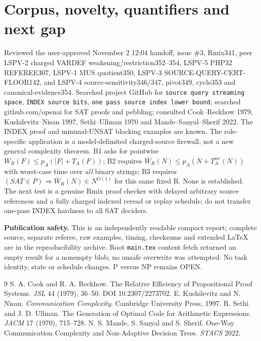 \documentclass[11pt]{article}
\begin{document}
\section*{Corpus, novelty, quantifiers and next gap}
Reviewed the user-approved November 2 12:04 handoff, issue \#3, Rmix341, peer LSPV-2 charged VARDEF weakening/restriction352--354, LSPV-5 PHP32 REFEREE307, LSPV-1 MUS quotient350, LSPV-3 SOURCE-QUERY-CERT-FLOOR142, and LSPV-4 source-sensitivity346/347, pivot349, cycle353 and canonical-evidence354. Searched project GitHub for \texttt{source query streaming space}, \texttt{INDEX source bits}, \texttt{one pass source index lower bound}; searched github.com/openai for SAT proofs and pebbling; consulted Cook--Reckhow 1979, Kushilevitz--Nisan 1997, Sethi--Ullman 1970 and Mande--Sanyal--Sherif 2022. The INDEX proof and minimal-UNSAT blocking examples are known. The role-specific application is a model-delimited charged-source firewall, not a new general complexity theorem.
B1 asks for pointwise $W_R(F)\le p_A(|F|+T_A(F))$; B2 requires $\overline W_R(N)\le p_A(N+T_A^{wc}(N))$ with worst-case time over \emph{all} binary strings; B3 requires $(SAT\in P)\Rightarrow\overline W_R(N)\in N^{O(1)}$ for this same fixed R. None is established. The next test is a genuine Rmix proof checker with delayed arbitrary source references and a fully charged indexed reread or replay schedule; do not transfer one-pass INDEX hardness to all SAT deciders.

\noindent \textbf{Publication safety.} This is an independently readable compact report; complete source, separate referee, raw examples, timing, checksums and extended LaTeX are in the reproducibility archive. Root \texttt{main.tex} content fetch returned an empty result for a nonempty blob; no unsafe overwrite was attempted. No task identity, state or schedule changes. P versus NP remains OPEN.
\begin{thebibliography}{9}
 S. A. Cook and R. A. Reckhow. The Relative Efficiency of Propositional Proof Systems. \emph{JSL} 44 (1979), 36--50. DOI 10.2307/2273702.
 E. Kushilevitz and N. Nisan. \emph{Communication Complexity}. Cambridge University Press, 1997.
 R. Sethi and J. D. Ullman. The Generation of Optimal Code for Arithmetic Expressions. \emph{JACM} 17 (1970), 715--728.
 N. S. Mande, S. Sanyal and S. Sherif. One-Way Communication Complexity and Non-Adaptive Decision Trees. \emph{STACS} 2022.
\end{thebibliography}
\end{document}
